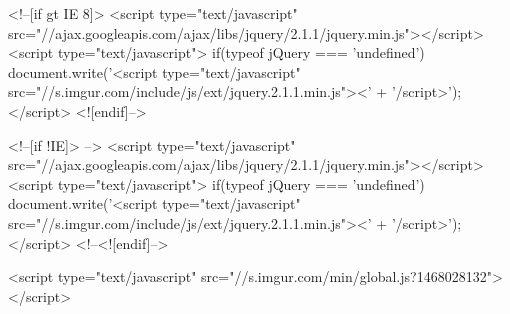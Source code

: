 <!--[if gt IE 8]>
<script type="text/javascript" src="//ajax.googleapis.com/ajax/libs/jquery/2.1.1/jquery.min.js"></script>
<script type="text/javascript">
if(typeof jQuery === 'undefined') {
    document.write('<script type="text/javascript" src="//s.imgur.com/include/js/ext/jquery.2.1.1.min.js"><' + '/script>');
}
</script>
<![endif]-->

<!--[if !IE]> -->
<script type="text/javascript" src="//ajax.googleapis.com/ajax/libs/jquery/2.1.1/jquery.min.js"></script>
<script type="text/javascript">
if(typeof jQuery === 'undefined') {
    document.write('<script type="text/javascript" src="//s.imgur.com/include/js/ext/jquery.2.1.1.min.js"><' + '/script>');
}
</script>
<!--<![endif]-->



        <script type="text/javascript" src="//s.imgur.com/min/global.js?1468028132"></script>

